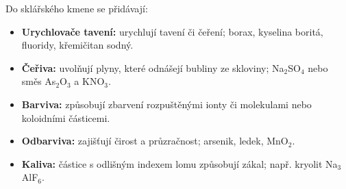 Do sklářského kmene se přidávají:
\begin{itemize}
\item \textbf{Urychlovače tavení:} urychlují tavení či čeření; borax, kyselina boritá, fluoridy, křemičitan sodný.
\item \textbf{Čeřiva:} uvolňují plyny, které odnášejí bubliny ze skloviny; Na$_2$SO$_4$ nebo směs As$_2$O$_3$ a KNO$_3$.
\item \textbf{Barviva:} způsobují zbarvení rozpuštěnými ionty či molekulami nebo koloidními částicemi.
\item \textbf{Odbarviva:} zajišťují čirost a průzračnost; arsenik, ledek, MnO$_2$.
\item \textbf{Kaliva:} částice s odlišným indexem lomu způsobují zákal; např. kryolit Na$_3$AlF$_6$.
\end{itemize}
